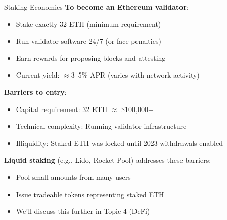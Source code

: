 \documentclass[10pt]{beamer}
\begin{document}
\begin{frame}{Staking Economics}
  \textbf{To become an Ethereum validator}:
  \begin{itemize}
    \item Stake exactly 32 ETH (minimum requirement)
    \item Run validator software 24/7 (or face penalties)
    \item Earn rewards for proposing blocks and attesting
    \item Current yield: $\approx$3--5\% APR (varies with network activity)
  \end{itemize}
  
  \vspace{1em}
  \textbf{Barriers to entry}:
  \begin{itemize}
    \item Capital requirement: 32 ETH $\approx$ \$100,000+
    \item Technical complexity: Running validator infrastructure
    \item Illiquidity: Staked ETH was locked until 2023 withdrawals enabled
  \end{itemize}
  
  \vspace{1em}
  \textbf{Liquid staking} (e.g., Lido, Rocket Pool) addresses these barriers:
  \begin{itemize}
    \item Pool small amounts from many users
    \item Issue tradeable tokens representing staked ETH
    \item We'll discuss this further in Topic 4 (DeFi)
  \end{itemize}
\end{frame}
\end{document}
